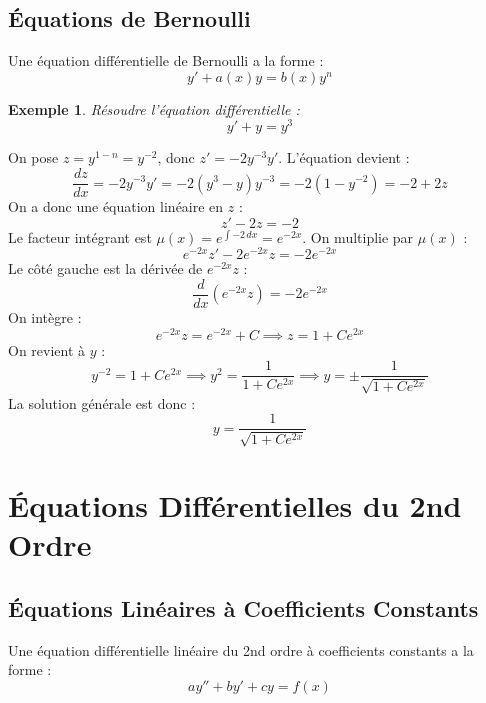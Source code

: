 \documentclass[12pt]{article}
\newtheorem{example}{Exemple}[section]
\begin{document}
\subsection{Équations de Bernoulli}
\begin{myequation}
Une équation différentielle de Bernoulli a la forme :
\[
y' + a(x) y = b(x) y^n
\]
\end{myequation}

\begin{example}
Résoudre l'équation différentielle :
\[
y' + y = y^3
\]
\end{example}

\begin{mybox}[Solution]
On pose $z = y^{1-n} = y^{-2}$, donc $z' = -2 y^{-3} y'$. L'équation devient :
\[
\frac{dz}{dx} = -2 y^{-3} y' = -2 (y^3 - y) y^{-3} = -2 (1 - y^{-2}) = -2 + 2z
\]
On a donc une équation linéaire en $z$ :
\[
z' - 2z = -2
\]
Le facteur intégrant est $\mu(x) = e^{\int -2 \, dx} = e^{-2x}$. On multiplie par $\mu(x)$ :
\[
e^{-2x} z' - 2 e^{-2x} z = -2 e^{-2x}
\]
Le côté gauche est la dérivée de $e^{-2x} z$ :
\[
\frac{d}{dx} \left( e^{-2x} z \right) = -2 e^{-2x}
\]
On intègre :
\[
e^{-2x} z = e^{-2x} + C \implies z = 1 + C e^{2x}
\]
On revient à $y$ :
\[
y^{-2} = 1 + C e^{2x} \implies y^2 = \frac{1}{1 + C e^{2x}} \implies y = \pm \frac{1}{\sqrt{1 + C e^{2x}}}
\]
La solution générale est donc :
\[
\boxed{y = \frac{1}{\sqrt{1 + C e^{2x}}}}
\]
\end{mybox}

\section{Équations Différentielles du 2nd Ordre}

\subsection{Équations Linéaires à Coefficients Constants}
\begin{myequation}
Une équation différentielle linéaire du 2nd ordre à coefficients constants a la forme :
\[
a y'' + b y' + c y = f(x)
\]
\end{myequation}
\end{document}
